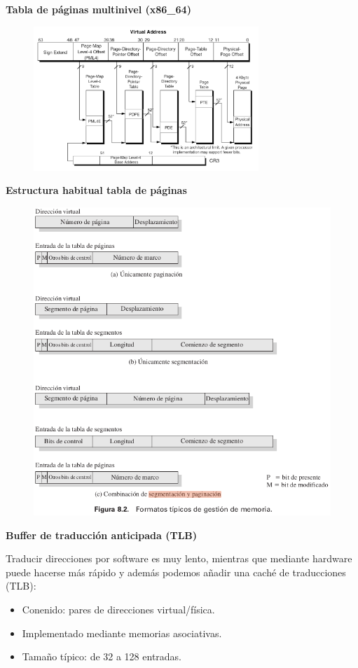 \documentclass{article}
\begin{document}
\textbf{Tabla de páginas multinivel (x86\_64)}
\begin{figure}[h]
\centering
\includegraphics[scale=1,width=85mm]{tabla_multinivel.png}
\end{figure}

\newpage

\textbf{Estructura habitual tabla de páginas}
\begin{figure}[h]
\centering
\includegraphics[scale=1,width=\textwidth]{estructuratabla.png}
\end{figure}

\textbf{Buffer de traducción anticipada (TLB)}

Traducir direcciones por software es muy lento, mientras que mediante hardware puede hacerse más rápido y además podemos añadir una caché de traducciones (TLB):
\begin{itemize}
\item Conenido: pares de direcciones virtual/física.

\item Implementado mediante memorias asociativas.

\item Tamaño típico: de 32 a 128 entradas.
\end{itemize}
\end{document}
